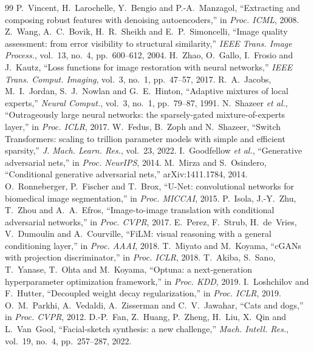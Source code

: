 \documentclass[conference]{IEEEtran}
\begin{document}
\begin{thebibliography}{99}
 P.~Vincent, H.~Larochelle, Y.~Bengio and P.-A.~Manzagol, ``Extracting and composing robust features with denoising autoencoders,'' in \emph{Proc. ICML}, 2008.
 Z.~Wang, A.~C.~Bovik, H.~R.~Sheikh and E.~P.~Simoncelli, ``Image quality assessment: from error visibility to structural similarity,'' \emph{IEEE Trans. Image Process.}, vol.~13, no.~4, pp.~600--612, 2004.
 H.~Zhao, O.~Gallo, I.~Frosio and J.~Kautz, ``Loss functions for image restoration with neural networks,'' \emph{IEEE Trans. Comput. Imaging}, vol.~3, no.~1, pp.~47--57, 2017.
 R.~A.~Jacobs, M.~I.~Jordan, S.~J.~Nowlan and G.~E.~Hinton, ``Adaptive mixtures of local experts,'' \emph{Neural Comput.}, vol.~3, no.~1, pp.~79--87, 1991.
 N.~Shazeer \emph{et al.}, ``Outrageously large neural networks: the sparsely-gated mixture-of-experts layer,'' in \emph{Proc. ICLR}, 2017.
 W.~Fedus, B.~Zoph and N.~Shazeer, ``Switch Transformers: scaling to trillion parameter models with simple and efficient sparsity,'' \emph{J. Mach. Learn. Res.}, vol.~23, 2022.
 I.~Goodfellow \emph{et al.}, ``Generative adversarial nets,'' in \emph{Proc. NeurIPS}, 2014.
 M.~Mirza and S.~Osindero, ``Conditional generative adversarial nets,'' arXiv:1411.1784, 2014.
 O.~Ronneberger, P.~Fischer and T.~Brox, ``U-Net: convolutional networks for biomedical image segmentation,'' in \emph{Proc. MICCAI}, 2015.
 P.~Isola, J.-Y.~Zhu, T.~Zhou and A.~A.~Efros, ``Image-to-image translation with conditional adversarial networks,'' in \emph{Proc. CVPR}, 2017.
 E.~Perez, F.~Strub, H.~de~Vries, V.~Dumoulin and A.~Courville, ``FiLM: visual reasoning with a general conditioning layer,'' in \emph{Proc. AAAI}, 2018.
 T.~Miyato and M.~Koyama, ``cGANs with projection discriminator,'' in \emph{Proc. ICLR}, 2018.
 T.~Akiba, S.~Sano, T.~Yanase, T.~Ohta and M.~Koyama, ``Optuna: a next-generation hyperparameter optimization framework,'' in \emph{Proc. KDD}, 2019.
 I.~Loshchilov and F.~Hutter, ``Decoupled weight decay regularization,'' in \emph{Proc. ICLR}, 2019.
 O.~M.~Parkhi, A.~Vedaldi, A.~Zisserman and C.~V.~Jawahar, ``Cats and dogs,'' in \emph{Proc. CVPR}, 2012.
 D.-P.~Fan, Z.~Huang, P.~Zheng, H.~Liu, X.~Qin and L.~Van~Gool, ``Facial-sketch synthesis: a new challenge,'' \emph{Mach. Intell. Res.}, vol.~19, no.~4, pp.~257--287, 2022.
\end{thebibliography}
\end{document}
